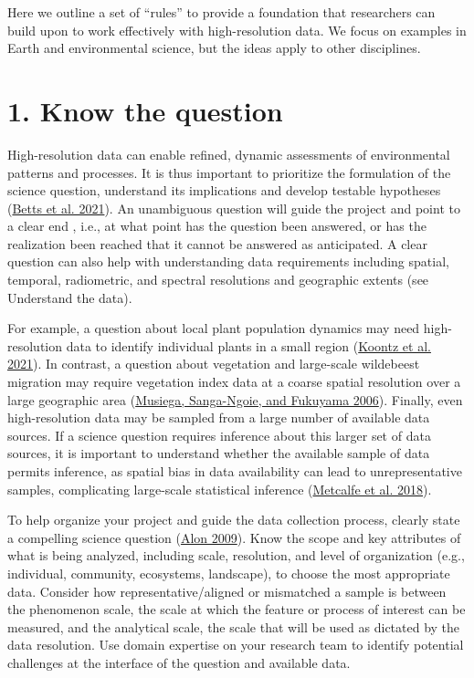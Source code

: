 \documentclass[
  12pt,
]{article}
\begin{document}
Here we outline a set of ``rules'' to provide a foundation that
researchers can build upon to work effectively with high-resolution
data. We focus on examples in Earth and environmental science, but the
ideas apply to other disciplines.

\hypertarget{know-the-question}{%
\section{1. Know the question}\label{know-the-question}}

High-resolution data can enable refined, dynamic assessments of
environmental patterns and processes. It is thus important to prioritize
the formulation of the science question, understand its implications and
develop testable hypotheses (\protect\hyperlink{ref-betts2021}{Betts et
al. 2021}). An unambiguous question will guide the project and point to
a clear end , i.e., at what point has the question been answered, or has
the realization been reached that it cannot be answered as anticipated.
A clear question can also help with understanding data requirements
including spatial, temporal, radiometric, and spectral resolutions and
geographic extents (see Understand the data).

For example, a question about local plant population dynamics may need
high-resolution data to identify individual plants in a small region
(\protect\hyperlink{ref-koontz2021cross}{Koontz et al. 2021}). In
contrast, a question about vegetation and large-scale wildebeest
migration may require vegetation index data at a coarse spatial
resolution over a large geographic area
(\protect\hyperlink{ref-musiega2006framework}{Musiega, Sanga-Ngoie, and
Fukuyama 2006}). Finally, even high-resolution data may be sampled from
a large number of available data sources. If a science question requires
inference about this larger set of data sources, it is important to
understand whether the available sample of data permits inference, as
spatial bias in data availability can lead to unrepresentative samples,
complicating large-scale statistical inference
(\protect\hyperlink{ref-metcalfe2018patchy}{Metcalfe et al. 2018}).

To help organize your project and guide the data collection process,
clearly state a compelling science question
(\protect\hyperlink{ref-alon2009}{Alon 2009}). Know the scope and key
attributes of what is being analyzed, including scale, resolution, and
level of organization (e.g., individual, community, ecosystems,
landscape), to choose the most appropriate data. Consider how
representative/aligned or mismatched a sample is between the phenomenon
scale, the scale at which the feature or process of interest can be
measured, and the analytical scale, the scale that will be used as
dictated by the data resolution. Use domain expertise on your research
team to identify potential challenges at the interface of the question
and available data.
\end{document}
